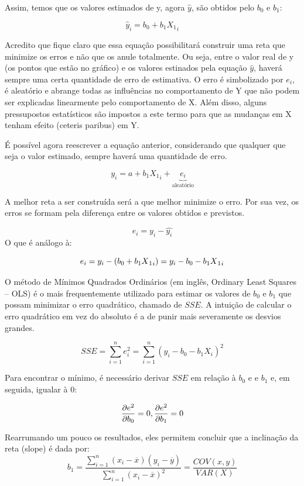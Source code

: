 \documentclass[
]{book}
\begin{document}
Assim, temos que os valores estimados de y, agora \(\hat{y}\), são
obtidos pelo \(b_0\) e \(b_1\):

\[\hat{y}_i = b_0 + b_1X{_1}_i\]

Acredito que fique claro que essa equação possibilitará construir uma
reta que minimize os erros e não que os anule totalmente. Ou seja, entre
o valor real de y (os pontos que estão no gráfico) e os valores
estinados pela equação \(\hat{y}\), haverá sempre uma certa quantidade
de erro de estimativa. O erro é simbolizado por \(e_i\), é aleatório e
abrange todas as influências no comportamento de Y que não podem ser
explicadas linearmente pelo comportamento de X. Além disso, alguns
pressupostos estatísticos são impostos a este termo para que as mudanças
em X tenham efeito (ceteris paribus) em Y.

É possível agora reescrever a equação anterior, considerando que
qualquer que seja o valor estimado, sempre haverá uma quantidade de
erro.

\[y_i = a + b_1X{_1}_i+\underbrace{e_i}_\text{aleatório}\]

A melhor reta a ser construída será a que melhor minimize o erro. Por
sua vez, os erros se formam pela diferença entre os valores obtidos e
previstos.

\[e_i = y_i - \hat{y_i}\] O que é análogo à:

\[e_i = y_i - (b_0 + b_1X{_1}_i) \\ =  y_i - b_0 - b_1X{_1}_i\]

O método de Mínimos Quadrados Ordinários (em inglês, Ordinary Least
Squares -- OLS) é o mais frequentemente utilizado para estimar os
valores de \(b_0\) e \(b_1\) que possam minimizar o erro quadrático,
chamado de \(SSE\). A intuição de calcular o erro quadrático em vez do
absoluto é a de punir mais severamente os desvios grandes.

\[SSE = \sum_{i=1}^n e_i^2 = \sum_{i=1}^n (y_i - b_0 - b_1 X_i)^2\]

Para encontrar o mínimo, é necessário derivar \(SSE\) em relação à
\(b_0\) e e \(b_1\) e, em seguida, igualar à 0:

\[\frac{\partial e^2}{\partial b_0}  = 0,\\ \frac{\partial e^2}{\partial b_1} = 0\]

Rearrumando um pouco os resultados, eles permitem concluir que a
inclinação da reta (slope) é dada por:
\[b_1=\frac{\sum\limits_{i=1}^{n} (x_i-\overline{x}) (y_i-\overline{y})}{\sum\limits_{i=1}^{n} (x_i-\overline{x})^2} = \frac{COV(x,y)}{VAR(X)}\]
\end{document}
